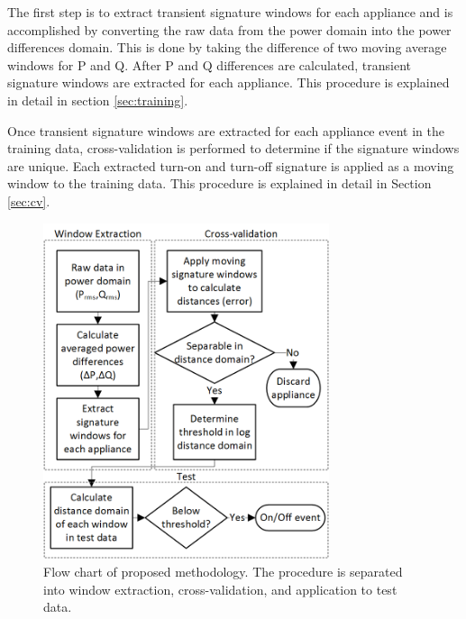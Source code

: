 \documentclass[conference]{IEEEtran}
\begin{document}
The first step is to extract transient signature windows for each appliance and is accomplished by converting the raw data from the power domain into the power differences domain. This is done by taking the difference of two moving average windows for P and Q.  After P and Q differences are calculated, transient signature windows are extracted for each appliance.  This procedure is explained in detail in section \ref{sec:training}. 

Once transient signature windows are extracted for each appliance event in the training data, cross-validation is performed to determine if the signature windows are unique.  Each extracted turn-on and turn-off signature is applied as a moving window to the training data.  This procedure is explained in detail in Section \ref{sec:cv}. 

\begin{figure}[!t]
	\centering
	\includegraphics[width=3.3in]{fig/flow.png}
	\caption{Flow chart of proposed methodology.  The procedure is separated into window extraction, cross-validation, and application to test data.}
	\label{fig:flow}
\end{figure}
\end{document}
